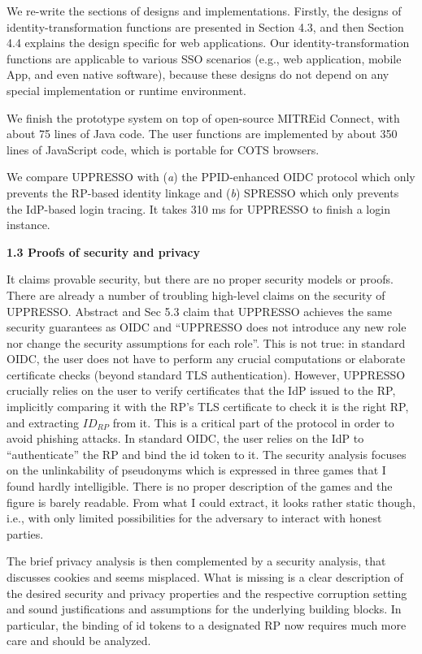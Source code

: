 \documentclass[letterpaper,onecolumn,10pt]{article}
\begin{document}
We re-write the sections of designs and implementations.
Firstly,
    the designs of identity-transformation functions are presented in Section 4.3,
        and then Section 4.4 explains the design specific for web applications.
Our identity-transformation functions are applicable to various SSO scenarios
        (e.g., web application, mobile App, and even native software),
    because these designs do not depend on any special implementation or runtime environment.

We finish the prototype system on top of open-source MITREid Connect,
    with about 75 lines of Java code.
The user functions are implemented by about 350 lines of JavaScript code,
    which is portable for COTS browsers.

We compare UPPRESSO with (\emph{a}) the PPID-enhanced OIDC protocol which only prevents the RP-based identity linkage
     and (\emph{b}) SPRESSO which only prevents the IdP-based login tracing.
It takes 310 ms for UPPRESSO to finish a login instance.

\vspace{1mm}\noindent\textbf{1.3 Proofs of security and privacy}

It claims provable security, but there are no proper security models or proofs.
There are already a number of troubling high-level claims on the security of UPPRESSO.
Abstract and Sec 5.3 claim that UPPRESSO achieves the same security guarantees as OIDC and ``UPPRESSO does not introduce any new role nor change the security assumptions for each role''.
This is not true: in standard OIDC, the user does not have to perform any crucial computations or elaborate certificate checks (beyond standard TLS authentication).
However, UPPRESSO crucially relies on the user to verify certificates that the IdP issued to the RP, implicitly comparing it with the RP's TLS certificate to check it is the right RP, and extracting $ID_{RP}$ from it.
This is a critical part of the protocol in order to avoid phishing attacks. In standard OIDC, the user relies on the IdP to ``authenticate'' the RP and bind the id token to it.
The security analysis focuses on the unlinkability of pseudonyms which is expressed in three games that I found hardly intelligible.
There is no proper description of the games and the figure is barely readable.
From what I could extract, it looks rather static though, i.e., with only limited possibilities for the adversary to interact with honest parties.

The brief privacy analysis is then complemented by a security analysis, that discusses cookies and seems misplaced.
What is missing is a clear description of the desired security and privacy properties and the respective corruption setting and sound justifications and assumptions for the underlying building blocks. In particular, the binding of id tokens to a designated RP now requires much more care and should be analyzed.
\end{document}
